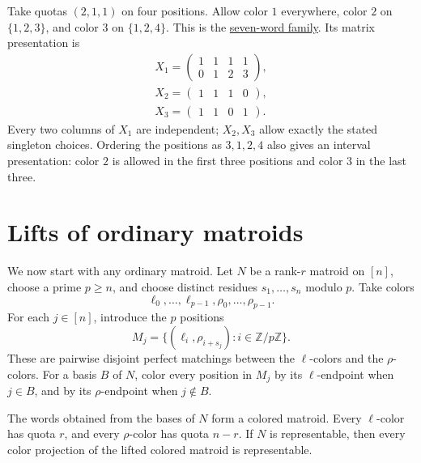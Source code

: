 \begin{example}
Take quotas $(2,1,1)$ on four positions. Allow color $1$ everywhere,
color $2$ on $\{1,2,3\}$, and color $3$ on $\{1,2,4\}$. This is the
\href{independence.htm#mixedCircuits}{seven-word family}. Its matrix
presentation is
\[
 \begin{gathered}
 X_1=\begin{pmatrix}1&1&1&1\\0&1&2&3\end{pmatrix},\\
 X_2=\begin{pmatrix}1&1&1&0\end{pmatrix},\\
 X_3=\begin{pmatrix}1&1&0&1\end{pmatrix}.
 \end{gathered}
\]
Every two columns of $X_1$ are independent; $X_2,X_3$ allow exactly
the stated singleton choices. Ordering the positions as $3,1,2,4$
also gives an interval presentation: color $2$ is allowed in the
first three positions and color $3$ in the last three.
\end{example}

\section[representedLifts]{Lifts of ordinary matroids}

We now start with any ordinary matroid. Let $N$
be a rank-$r$ matroid on $[n]$, choose a prime $p\geq n$, and choose distinct
residues $s_1,\dotsc,s_n$ modulo $p$. Take colors
\[
 \ell_0,\dotsc,\ell_{p-1},\rho_0,\dotsc,\rho_{p-1}.
\]
For each $j\in[n]$, introduce the $p$ positions
\[
 M_j=\{(\ell_i,\rho_{i+s_j}):i\in\mathbb Z/p\mathbb Z\}.
\]
These are pairwise disjoint perfect matchings between the $\ell$-colors and
the $\rho$-colors.
For a basis $B$ of $N$, color every position in $M_j$ by its $\ell$-endpoint
when $j\in B$, and by its $\rho$-endpoint when $j\notin B$.

\begin{theorem}
The words obtained from the bases of $N$ form a colored matroid. Every
$\ell$-color has quota $r$, and every $\rho$-color has quota $n-r$.
If $N$ is representable, then every color projection of the lifted colored
matroid is representable.
\end{theorem}

